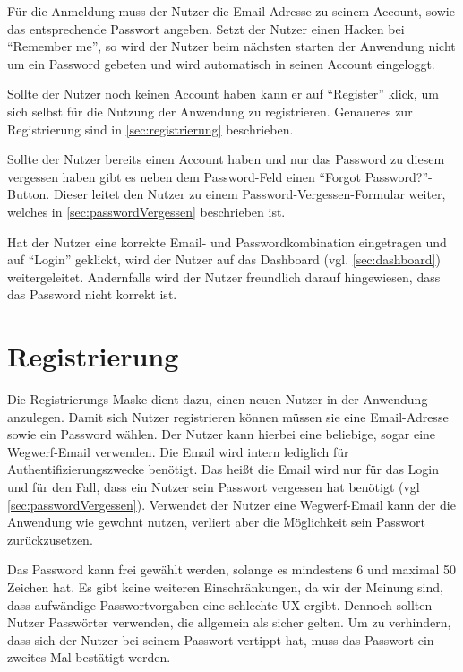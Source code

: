 Für die Anmeldung muss der Nutzer die Email-Adresse zu seinem Account, sowie das entsprechende Passwort angeben.
Setzt der Nutzer einen Hacken bei \enquote{Remember me}, so wird der Nutzer beim nächsten starten der Anwendung nicht um ein Password gebeten und wird automatisch in seinen Account eingeloggt.

Sollte der Nutzer noch keinen Account haben kann er auf \enquote{Register} klick, um sich selbst für die Nutzung der Anwendung zu registrieren.
Genaueres zur Registrierung sind in \autoref{sec:registrierung} beschrieben.

Sollte der Nutzer bereits einen Account haben und nur das Password zu diesem vergessen haben gibt es neben dem Password-Feld einen \enquote{Forgot Password?}-Button.
Dieser leitet den Nutzer zu einem Password-Vergessen-Formular weiter, welches in \autoref{sec:passwordVergessen} beschrieben ist.

Hat der Nutzer eine korrekte Email- und Passwordkombination eingetragen und auf \enquote{Login} geklickt, wird der Nutzer auf das Dashboard (vgl. \autoref{sec:dashboard}) weitergeleitet.
Andernfalls wird der Nutzer freundlich darauf hingewiesen, dass das Password nicht korrekt ist.



\section{Registrierung}\label{sec:registrierung}
Die Registrierungs-Maske dient dazu, einen neuen Nutzer in der Anwendung anzulegen.
Damit sich Nutzer registrieren können müssen sie eine Email-Adresse sowie ein Password wählen.
Der Nutzer kann hierbei eine beliebige, sogar eine Wegwerf-Email verwenden.
Die Email wird intern lediglich für Authentifizierungszwecke benötigt.
Das heißt die Email wird nur für das Login und für den Fall, dass ein Nutzer sein Passwort vergessen hat benötigt (vgl \autoref{sec:passwordVergessen}).
Verwendet der Nutzer eine Wegwerf-Email kann der die Anwendung wie gewohnt nutzen, verliert aber die Möglichkeit sein Passwort zurückzusetzen.

Das Password kann frei gewählt werden, solange es mindestens 6 und maximal 50 Zeichen hat.
Es gibt keine weiteren Einschränkungen, da wir der Meinung sind, dass aufwändige Passwortvorgaben eine schlechte \ac{UX} ergibt.
Dennoch sollten Nutzer Passwörter verwenden, die allgemein als sicher gelten.
Um zu verhindern, dass sich der Nutzer bei seinem Passwort vertippt hat, muss das Passwort ein zweites Mal bestätigt werden.


